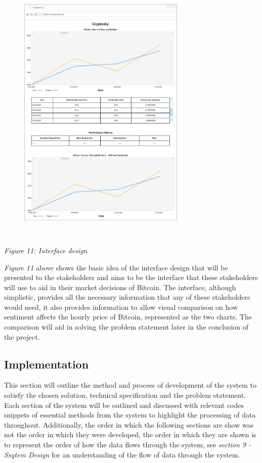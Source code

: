 \documentclass[oneside, 12pt]{article}
\begin{document}
		\begin{figure}[hbt!]
			\centering
			\includegraphics[width=8cm,height=13cm]{images/interface_design.png}
		\end{figure}
		\begin{center}
			\textit{Figure 11: Interface design}
		\end{center}
		\textit{Figure 11} above shows the basic idea of the interface design that will be presented to the stakeholders and aims to be the interface that these stakeholders will use to aid in their market decisions of Bitcoin. The interface, although simplistic, provides all the necessary information that any of these stakeholders would need, it also provides information to allow visual comparison on how sentiment affects the hourly price of Bitcoin, represented as the two charts. The comparison will aid in solving the problem statement later in the conclusion of the project.
		
	\newpage 
	\begin{center}
		\section{Implementation}\label{implementation}
	\end{center}
		This section will outline the method and process of development of the system to satisfy the chosen solution, technical specification and the problem statement. Each section of the system will be outlined and discussed with relevant codes snippets of essential methods from the system to highlight the processing of data throughout. Additionally, the order in which the following sections are show was not the order in which they were developed, the order in which they are shown is to represent the order of how the data flows through the system, see \textit{section 9 - Ssytem Design} for an understanding of the flow of data through the system.
		\newline
		
\end{document}
